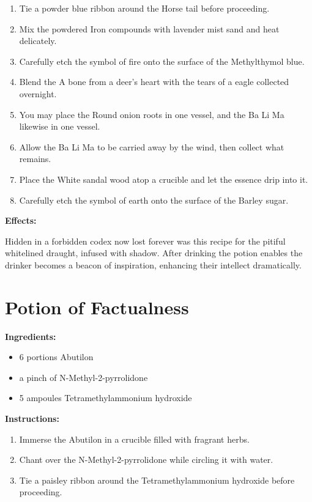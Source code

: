 \documentclass{article}
\begin{document}
\begin{enumerate}
  \item Tie a powder blue ribbon around the Horse tail before proceeding.
  \item Mix the powdered Iron compounds with lavender mist sand and heat delicately.
  \item Carefully etch the symbol of fire onto the surface of the Methylthymol blue.
  \item Blend the A bone from a deer's heart with the tears of a eagle collected overnight.
  \item You may place the Round onion roots in one vessel, and the Ba Li Ma likewise in one vessel.
  \item Allow the Ba Li Ma to be carried away by the wind, then collect what remains.
  \item Place the White sandal wood atop a crucible and let the essence drip into it.
  \item Carefully etch the symbol of earth onto the surface of the Barley sugar.
\end{enumerate}

\textbf{Effects:}

Hidden in a forbidden codex now lost forever was this recipe for the pitiful whitelined draught, infused with shadow. After drinking the potion enables the drinker becomes a beacon of inspiration, enhancing their intellect dramatically.

\newpage
\section*{Potion of Factualness}

\textbf{Ingredients:}

\begin{itemize}
  \item 6 portions Abutilon
  \item a pinch of N-Methyl-2-pyrrolidone
  \item 5 ampoules Tetramethylammonium hydroxide
\end{itemize}

\textbf{Instructions:}

\begin{enumerate}
  \item Immerse the Abutilon in a crucible filled with fragrant herbs.
  \item Chant over the N-Methyl-2-pyrrolidone while circling it with water.
  \item Tie a paisley ribbon around the Tetramethylammonium hydroxide before proceeding.
\end{enumerate}
\end{document}

